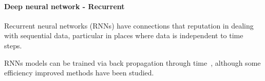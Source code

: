 \paragraph{Deep neural network - Recurrent}
Recurrent neural networks (RNNs) have connections that  reputation in dealing with sequential data, particular in places where data is independent to time steps. 


RNNs models can be trained via back propagation through time~\cite{Goodfellow-et-al-2016}, although some efficiency improved methods have been studied.~\cite{963769,neco.1989,Gomez:2008:ANE:1390681.1390712}